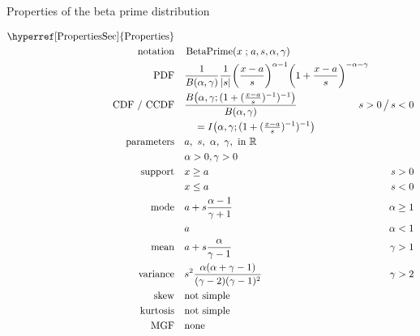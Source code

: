 

\begin{table*}[tp]
\caption[Beta prime distribution -- Properties] {Properties of the beta prime distribution}
\begin{align*}
 \text{\hyperref[PropertiesSec]{Properties}}  \quad& \\
\text{notation} \quad & \op{BetaPrime}(x\given a, s, \alpha,\gamma)  	\checked
\\
\text{PDF}\quad &    \frac{1}{B(\alpha, \gamma)} \frac{1}{|s|}
\Left(\frac{x-a}{s}\Right)^{\alpha -1} \Left(1+ \frac{x-a}{s} \Right)^{-\alpha-\gamma } \checked
\hspace{-2em}
\\
\text{CDF / CCDF} \quad  &  
\frac{B\big(\alpha, \gamma; (1+(\tfrac{x-a}{s})^{-1})^{-1} \big) }{B(\alpha,\gamma)} \checked
\hspace{-8em}
& s >0 \,\big/ \, s<0
\\ 
& \quad = I\Left(  \alpha,\gamma; (1+(\tfrac{x-a}{s})^{-1})^{-1} \Right) 			\checked
\\
\text{parameters}\quad &   a,\ s,\ \alpha,\ \gamma, \text{ in } \Real \checked 
\\ & \alpha>0, \gamma>0 \checked
\\
\text{support} \quad &    x \geq a &  s > 0 			\checked
\\
&  x\leq a  &  s < 0 							\checked
\\
\text{mode} \quad  & a + s \frac{\alpha-1}{\gamma+1} & \alpha\geq 1 \checked \\
& a &\alpha<1 \checked
\\
\text{mean} \quad  &   a+s \frac{ \alpha}{\gamma-1} \checked
& \gamma >1
\\
\text{variance} \quad  &s^2
\frac{\alpha(\alpha+\gamma-1)}{(\gamma-2)(\gamma-1)^2} \checked
  \hspace{-8em}
&   \gamma>2
\\
\text{skew} \quad  &  \text{not simple}
\\
\text{kurtosis} \quad  &  \text{not simple}
\\
\text{MGF} \quad  &  \text{none}
\end{align*}
\end{table*}


